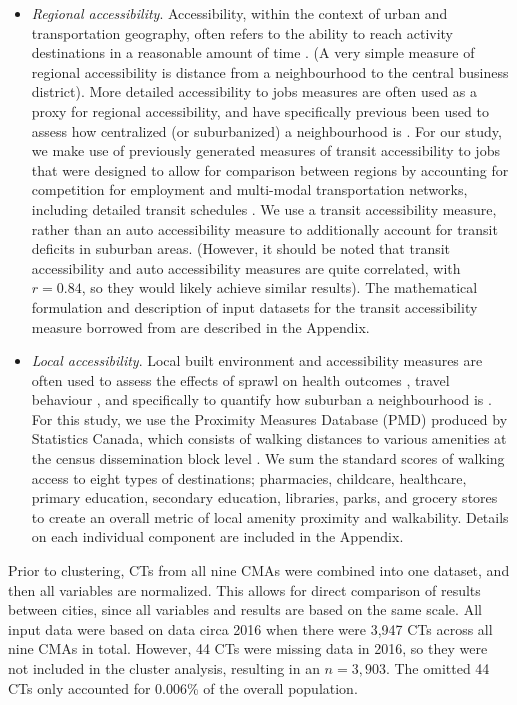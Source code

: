 \begin{itemize}
	\item \textit{Regional accessibility}. Accessibility, within the context of urban and transportation geography, often refers to the ability to reach activity destinations in a reasonable amount of time \cite{hansen_how_1959,geurs_accessibility_2004}. (A very simple measure of regional accessibility is distance from a neighbourhood to the central business district). More detailed accessibility to jobs measures are often used as a proxy for regional accessibility, and have specifically previous been used to assess how centralized (or suburbanized) a neighbourhood is \cite{torrens2000measuring,zhang_dynamics_2020}. For our study, we make use of previously generated measures of transit accessibility to jobs that were designed to allow for comparison between regions by accounting for competition for employment and multi-modal transportation networks, including detailed transit schedules \cite{allen_measure_2020}. We use a transit accessibility measure, rather than an auto accessibility measure to additionally account for transit deficits in suburban areas. (However, it should be noted that transit accessibility and auto accessibility measures are quite correlated, with $r = 0.84$, so they would likely achieve similar results). The mathematical formulation and description of input datasets for the transit accessibility measure borrowed from  are described in the Appendix.
	
	\item \textit{Local accessibility}. Local built environment and accessibility measures are often used to assess the effects of sprawl on health outcomes \cite{ewing_relationship_2003}, travel behaviour \cite{ewing_travel_2010}, and specifically to quantify how suburban a neighbourhood is \cite{ewing2014measuring}. For this study, we use the Proximity Measures Database (PMD) produced by Statistics Canada, which consists of walking distances to various amenities at the census dissemination block level \cite{statistics_canada_proximity_2020}. We sum the standard scores of walking access to eight types of destinations; pharmacies, childcare, healthcare, primary education, secondary education, libraries, parks, and grocery stores to create an overall metric of local amenity proximity and walkability. Details on each individual component are included in the Appendix.
	
\end{itemize}

Prior to clustering, CTs from all nine CMAs were combined into one dataset, and then all variables are normalized. This allows for direct comparison of results between cities, since all variables and results are based on the same scale. All input data were based on data circa 2016 when there were 3,947 CTs across all nine CMAs in total. However, 44 CTs were missing data in 2016, so they were not included in the cluster analysis, resulting in an $n = 3,903$. The omitted 44 CTs only accounted for 0.006\% of the overall population. 


